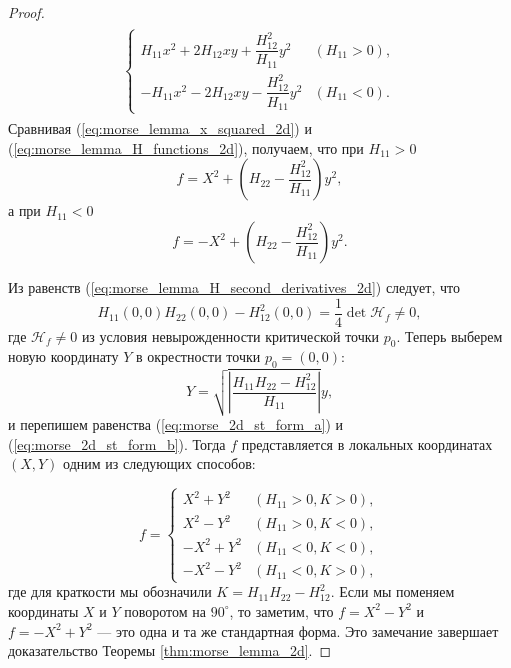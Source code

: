 \documentclass[a4paper,12pt,openany,leqno]{extbook}
\begin{document}
\begin{proof}
\begin{align}
\begin{split}
\begin{cases}
H_{11}x^2 + 2 H_{12} xy + \dfrac{H^2_{12}}{H_{11}} y^2 & (H_{11} > 0),\\
-H_{11}x^2 - 2 H_{12} xy - \dfrac{H^2_{12}}{H_{11}} y^2 & (H_{11} < 0).
\end{cases}
\end{split}
\label{eq:morse_lemma_x_squared_2d}
\end{align}
Сравнивая (\ref{eq:morse_lemma_x_squared_2d}) и (\ref{eq:morse_lemma_H_functions_2d}), получаем, что при $H_{11} > 0$
\begin{equation}
f = X^2 + \left(H_{22} - \dfrac{H^2_{12}}{H_{11}}\right) y^2,
\label{eq:morse_2d_st_form_a}
\end{equation}
а при $H_{11} < 0$
\begin{equation}
f = -X^2 + \left(H_{22} - \dfrac{H^2_{12}}{H_{11}}\right) y^2.
\label{eq:morse_2d_st_form_b}
\end{equation}

Из равенств (\ref{eq:morse_lemma_H_second_derivatives_2d}) следует, что
\begin{equation}
H_{11}(0, 0) H_{22}(0, 0) - H_{12}^2(0, 0) = \dfrac{1}{4} \det \mathcal{H}_f \neq 0,
\end{equation}
где $\mathcal{H}_f \neq 0$ из условия невырожденности критической точки $p_0$. Теперь выберем новую координату $Y$ в окрестности точки $p_0 = (0, 0)$:
\begin{equation}
Y = \sqrt{\left|\dfrac{H_{11} H_{22} - H_{12}^2}{H_{11}}\right|}y,
\end{equation}
и перепишем равенства (\ref{eq:morse_2d_st_form_a}) и (\ref{eq:morse_2d_st_form_b}). Тогда $f$ представляется в локальных координатах $(X, Y)$ одним из следующих способов:

\begin{equation}
f =
\begin{cases}
X^2 + Y^2 & (H_{11} > 0, K > 0),\\
X^2 - Y^2 & (H_{11} > 0, K < 0),\\
-X^2 + Y^2 & (H_{11} < 0, K < 0),\\
-X^2 - Y^2 & (H_{11} < 0, K > 0),
\end{cases}
\end{equation}
где для краткости мы обозначили $K = H_{11} H_{22} - H_{12}^2$. Если мы поменяем координаты $X$ и $Y$ поворотом на $90^{\circ}$, то заметим, что $f = X^2 - Y^2$ и $f = -X^2 + Y^2$ --- это одна и та же стандартная форма. Это замечание завершает доказательство Теоремы \ref{thm:morse_lemma_2d}.
\end{proof}
\end{document}
